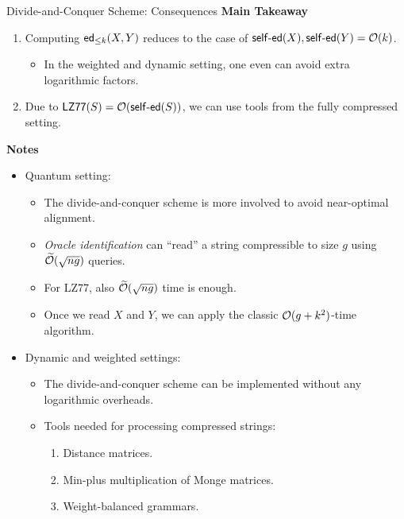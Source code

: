 \documentclass[sans-serif,aspectratio=169]{beamer}
\begin{document}
  \begin{frame}{Divide-and-Conquer Scheme: Consequences}
    \textbf{Main Takeaway}
   \begin{enumerate}
    \item Computing $\mathsf{ed}_{\le k}(X,Y)$ reduces to the case of $\mathsf{self}\text{-}\mathsf{ed}(X), \mathsf{self}\text{-}\mathsf{ed}(Y)=\mathcal{O}(k)$.
    \begin{itemize}
        \item<2-> In the weighted and dynamic setting, one even can avoid extra logarithmic factors.
    \end{itemize}
    \item<3-> Due to $\mathsf{LZ77}(S)=\mathcal{O}(\mathsf{self}\text{-}\mathsf{ed}(S))$, we can use tools from the fully compressed setting.
\end{enumerate}
\pause\pause\pause\bigskip

\textbf{Notes}
\begin{itemize}
    \item<4-> Quantum setting:
    \begin{itemize}
        \item<4-> The divide-and-conquer scheme is more involved to avoid near-optimal alignment.
        \item<5-> \emph{Oracle identification} can ``read'' a string compressible to size $g$ using $\widetilde{\mathcal{O}}(\sqrt{ng})$ queries.
        \item<5-> For LZ77, also $\widetilde{\mathcal{O}}(\sqrt{ng})$ time is enough.
        \item<6-> Once we read $X$ and $Y$, we can apply the classic $\mathcal{O}(g+k^2)$-time algorithm.
    \end{itemize}
    \item<7->Dynamic and weighted settings:
    \begin{itemize}
        \item<7-> The divide-and-conquer scheme can be implemented without any logarithmic overheads.
        \item<8-> Tools needed for processing compressed strings: 
        \begin{enumerate}
            \item Distance matrices.
            \item Min-plus multiplication of Monge matrices.
            \item Weight-balanced grammars.
        \end{enumerate}
    \end{itemize}
   \end{itemize}
  \end{frame}
\end{document}
